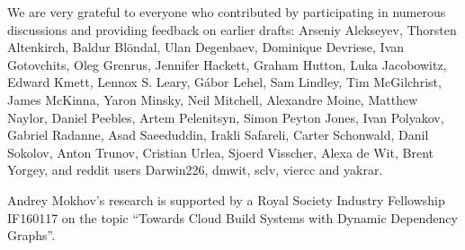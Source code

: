 \documentclass[acmsmall,review]{acmart}\settopmatter{printfolios=true}
\newcommand{\cmd}[1]{\textsf{\color[rgb]{0,0,0.5} #1}}
\begin{document}


\maketitle
\thispagestyle{firstpagestyle}










\begin{acks}
  \vspace{-0.5mm}
  We are very grateful to everyone who contributed by participating in numerous
  discussions and providing feedback on earlier drafts: Arseniy Alekseyev,
  Thorsten Altenkirch, Baldur Bl{\"o}ndal, Ulan Degenbaev, Dominique Devriese,
  Ivan Gotovchits, Oleg Grenrus, Jennifer Hackett, Graham Hutton,
  Luka Jacobowitz, Edward Kmett, Lennox S. Leary, G\'abor Lehel, Sam Lindley,
  Tim McGilchrist, James McKinna, Yaron Minsky, Neil Mitchell,
  Alexandre Moine, Matthew Naylor, Daniel Peebles, Artem Pelenitsyn,
  Simon Peyton Jones, Ivan Polyakov, Gabriel Radanne, Asad Saeeduddin,
  Irakli Safareli, Carter Schonwald, Danil Sokolov, Anton Trunov,
  Cristian Urlea, Sjoerd Visscher, Alexa de Wit, Brent Yorgey,
  and reddit users \cmd{Darwin226}, \cmd{dmwit}, \cmd{sclv}, \cmd{viercc} and
  \cmd{yakrar}.

  Andrey Mokhov's research is supported by a Royal Society Industry Fellowship
  \cmd{IF160117} on the topic ``Towards Cloud Build Systems with Dynamic
  Dependency Graphs''.
  \vspace{-1.5mm}
\end{acks}



\end{document}

